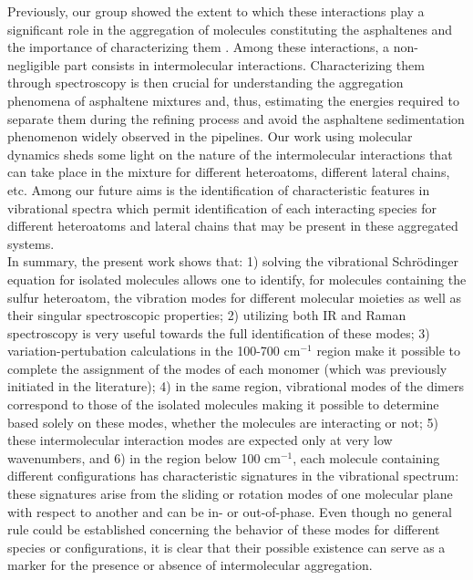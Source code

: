 		Previously, our group showed the extent to which these interactions play a significant role in the aggregation of molecules constituting the asphaltenes and the importance of characterizing them \cite{silva2016molecular}. Among these interactions, a non-negligible part consists in intermolecular interactions. Characterizing them through spectroscopy is then crucial for understanding the aggregation phenomena of asphaltene mixtures and, thus, estimating the energies required to separate them during the refining process and avoid the asphaltene sedimentation phenomenon widely observed in the pipelines. Our work using molecular dynamics sheds some light on the nature of the intermolecular interactions that can take place in the mixture for different heteroatoms, different lateral chains, etc. Among our future aims is the identification of characteristic features in vibrational spectra which permit identification of each interacting species for different heteroatoms and lateral chains that may be present in these aggregated systems.\\
		
		In summary, the present work shows that: 1) solving the vibrational Schr\"{o}dinger equation for isolated molecules allows one to identify, for molecules containing the sulfur heteroatom, the vibration modes for different molecular moieties as well as their singular spectroscopic properties; 2) utilizing both IR and Raman spectroscopy is very useful towards the full identification of these modes; 3) variation-pertubation calculations in the 100-700 cm$^{-1}$ region make it possible to complete the assignment of the modes of each monomer (which was previously initiated in the literature); 4) in the same region, vibrational modes of the dimers correspond to those of the isolated molecules making it possible to determine based solely on these modes, whether the molecules are interacting or not; 5) these intermolecular interaction modes are expected only at very low wavenumbers, and 6) in the region below 100 cm$^{-1}$, each molecule containing different configurations has characteristic signatures in the vibrational spectrum: these signatures arise from the sliding or rotation modes of one molecular plane with respect to another and can be in- or out-of-phase. Even though no general rule could be established concerning the behavior of these modes for different species or configurations, it is clear that their possible existence can serve as a marker for the presence or absence of intermolecular aggregation.\\ 
		
